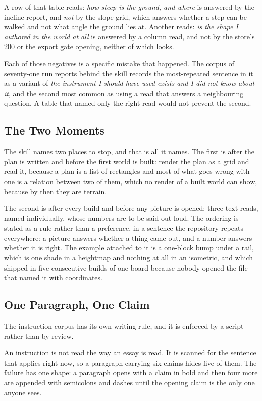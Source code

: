 A row of that table reads: \emph{how steep is the ground, and where} is answered by
the incline report, and \emph{not} by the slope grid, which answers whether a step
can be walked and not what angle the ground lies at. Another reads: \emph{is the
shape I authored in the world at all} is answered by a column read, and not by the
store's 200 or the export gate opening, neither of which looks.

Each of those negatives is a specific mistake that happened. The corpus of
seventy-one run reports behind the skill records the most-repeated sentence in it
as a variant of \emph{the instrument I should have used exists and I did not know
about it}, and the second most common as using a read that answers a neighbouring
question. A table that named only the right read would not prevent the second.

\subsection{The Two Moments}

The skill names two places to stop, and that is all it names. The first is after
the plan is written and before the first world is built: render the plan as a grid
and read it, because a plan is a list of rectangles and most of what goes wrong
with one is a relation between two of them, which no render of a built world can
show, because by then they are terrain.

The second is after every build and before any picture is opened: three text reads,
named individually, whose numbers are to be said out loud. The ordering is stated
as a rule rather than a preference, in a sentence the repository repeats
everywhere: a picture answers whether a thing came out, and a number answers
whether it is right. The example attached to it is a one-block bump under a rail,
which is one shade in a heightmap and nothing at all in an isometric, and which
shipped in five consecutive builds of one board because nobody opened the file that
named it with coordinates.

\subsection{One Paragraph, One Claim}

The instruction corpus has its own writing rule, and it is enforced by a script
rather than by review.

An instruction is not read the way an essay is read. It is scanned for the sentence
that applies right now, so a paragraph carrying six claims hides five of them. The
failure has one shape: a paragraph opens with a claim in bold and then four more
are appended with semicolons and dashes until the opening claim is the only one
anyone sees.

